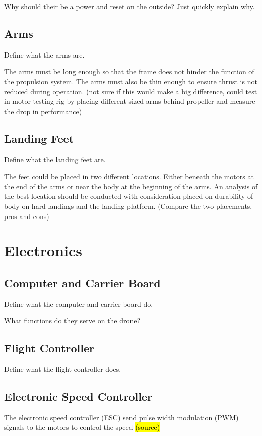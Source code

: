 Why should their be a power and reset on the outside? Just quickly explain why.


\subsection{Arms}
Define what the arms are.

The arms must be long enough so that the frame does not hinder the function of the propulsion system. The arms must also be thin enough to ensure thrust is not reduced during operation. (not sure if this would make a big difference, could test in motor testing rig by placing different sized arms behind propeller and measure the drop in performance)

\subsection{Landing Feet}
Define what the landing feet are.

The feet could be placed in two different locations. Either beneath the motors at the end of the arms or near the body at the beginning of the arms. An analysis of the best location should be conducted with consideration placed on durability of body on hard landings and the landing platform. (Compare the two placements, pros and cons)

\section{Electronics}

\subsection{Computer and Carrier Board}
Define what the computer and carrier board do. 

What functions do they serve on the drone?

\subsection{Flight Controller}
Define what the flight controller does.

\subsection{Electronic Speed Controller}
The electronic speed controller (ESC) send pulse width modulation (PWM) signals to the motors to control the speed \hl{(source)}

